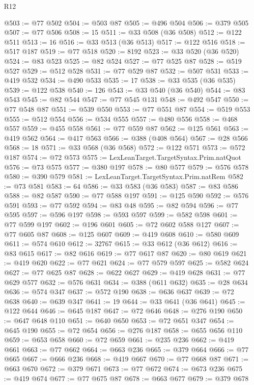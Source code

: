 \begin{lexlean}{R12}
\begin{coremodule}
@503 := @77 @502
@504 := @503 @87
@505 := @496 @504
@506 := @379 @505
@507 := @77 @506
@508 := 15
@511 := @33 @508 (@36 @508)
@512 := @122 @511
@513 := 16
@516 := @33 @513 (@36 @513)
@517 := @122 @516
@518 := @517 @187
@519 := @77 @518
@520 := 8192
@523 := @33 @520 (@36 @520)
@524 := @83 @523
@525 := @82 @524
@527 := @77 @525 @87
@528 := @519 @527
@529 := @512 @528
@531 := @77 @529 @87
@532 := @507 @531
@533 := @419 @532
@534 := @490 @533
@535 := 17
@538 := @33 @535 (@36 @535)
@539 := @122 @538
@540 := 126
@543 := @33 @540 (@36 @540)
@544 := @83 @543
@545 := @82 @544
@547 := @77 @545 @131
@548 := @492 @547
@550 := @77 @548 @87
@551 := @539 @550
@553 := @77 @551 @87
@554 := @519 @553
@555 := @512 @554
@556 := @534 @555
@557 := @480 @556
@558 := @468 @557
@559 := @455 @558
@561 := @77 @559 @87
@562 := @125 @561
@563 := @419 @562
@564 := @417 @563
@566 := @388 (@408 @564)
@567 := @28 @566
@568 := 18
@571 := @33 @568 (@36 @568)
@572 := @122 @571
@573 := @572 @187
@574 := @72 @573
@575 := LexLeanTarget.TargetSyntax.Prim.natQuot
@576 := @73 @575
@577 := @380 @197
@578 := @80 @577
@579 := @576 @578
@580 := @390 @579
@581 := LexLeanTarget.TargetSyntax.Prim.natRem
@582 := @73 @581
@583 := 64
@586 := @33 @583 (@36 @583)
@587 := @83 @586
@588 := @82 @587
@590 := @77 @588 @197
@591 := @125 @590
@592 := @576 @591
@593 := @77 @592
@594 := @83 @48
@595 := @82 @594
@596 := @77 @595
@597 := @596 @197
@598 := @593 @597
@599 := @582 @598
@601 := @77 @599 @197
@602 := @196 @601
@605 := @72 @602 @588 @127
@607 := @77 @605 @87
@608 := @125 @607
@609 := @419 @608
@610 := @580 @609
@611 := @574 @610
@612 := 32767
@615 := @33 @612 (@36 @612)
@616 := @83 @615
@617 := @82 @616
@619 := @77 @617 @87
@620 := @80 @619
@621 := @419 @620
@622 := @77 @621
@624 := @77 @579 @597
@625 := @582 @624
@627 := @77 @625 @87
@628 := @622 @627
@629 := @419 @628
@631 := @77 @629 @577
@632 := @576 @631
@634 := @388 (@611 @632)
@635 := @28 @634
@636 := @574 @347
@637 := @572 @190
@638 := @636 @637
@639 := @72 @638
@640 := @639 @347
@641 := 19
@644 := @33 @641 (@36 @641)
@645 := @122 @644
@646 := @645 @187
@647 := @72 @646
@648 := @276 @190
@650 := @647 @648 @110
@651 := @640 @650
@653 := @72 @651 @347
@654 := @645 @190
@655 := @72 @654
@656 := @276 @187
@658 := @655 @656 @110
@659 := @653 @658
@660 := @72 @659
@661 := @235 @236
@662 := @419 @661
@663 := @77 @662
@664 := @663 @236
@665 := @379 @664
@666 := @77 @665
@667 := @666 @236
@668 := @419 @667
@670 := @77 @668 @87
@671 := @663 @670
@672 := @379 @671
@673 := @77 @672
@674 := @673 @236
@675 := @419 @674
@677 := @77 @675 @87
@678 := @663 @677
@679 := @379 @678

\end{coremodule}
\end{lexlean}

